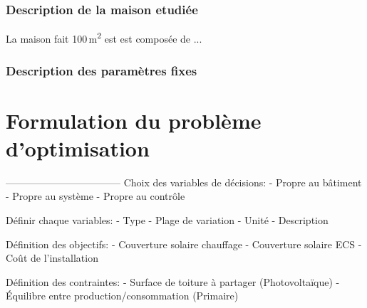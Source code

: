 \\
\\


\subsubsection{Description de la maison etudiée} %
\label{ssub:description_de_la_maison_etudiee}
La maison fait 100\,\si{m^{2}} est est composée de ...



\subsubsection{Description des paramètres fixes} %
\label{ssub:description_des_parametres_fixes}





\section{Formulation du problème d’optimisation} %
\label{sec:formulation_du_probleme_d_optimisation}
-----------------------------------
Choix des variables de décisions:
 - Propre au bâtiment
 - Propre au système
 - Propre au contrôle

Définir chaque variables:
 - Type
 - Plage de variation
 - Unité
 - Description


Définition des objectifs:
 - Couverture solaire chauffage
 - Couverture solaire ECS
 - Coût de l’installation


Définition des contraintes:
 - Surface de toiture à partager (Photovoltaïque)
 - Équilibre entre production/consommation (Primaire)


